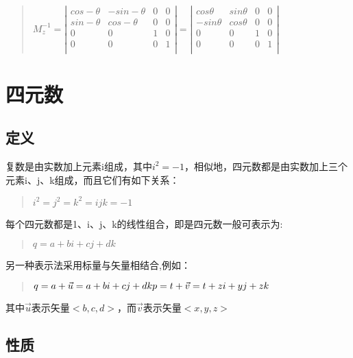 \documentclass[a4paper,10pt]{article}
\begin{document}
\begin{CJK}{UTF8}{song}
\begin{enumerate}
\begin{quote}
\begin{math}
M_{z}^{-1}=\left|
\begin{array}{cccc}
cos-\theta & -sin-\theta & 0 & 0  \\
sin-\theta & cos-\theta & 0 & 0 \\
0 & 0 & 1 & 0 \\
0 & 0 & 0 & 1 \\
\end{array}
\right| 
=
\left| 
\begin{array}{cccc}
cos\theta & sin\theta & 0 & 0 \\
-sin\theta & cos\theta & 0 & 0 \\
0 & 0 & 1 & 0 \\
0 & 0 & 0 & 1 \\
\end{array}
\right|
\end{math}
\end{quote}
\end{enumerate}

\section{四元数}
\subsection{定义}
复数是由实数加上元素i组成，其中$i^{2}=-1$，相似地，四元数都是由实数加上三个元素i、j、k组成，而且它们有如下关系：
\begin{quote}
\begin{math}
i^{2}=j^{2}=k^{2}=ijk=-1 
\end{math}
\end{quote}
每个四元数都是1、i、j、k的线性组合，即是四元数一般可表示为:
\begin{quote}
$q=a+bi+cj+dk$
\end{quote}
另一种表示法采用标量与矢量相结合,例如：
\begin{quote}
\begin{math}
q=a+\vec{u}=a+bi+cj+dk \\
p=t+\vec{v}=t+zi+yj+zk
\end{math}
\end{quote}
其中$\vec{u}$表示矢量$<b,c,d>$，而$\vec{v}$表示矢量$<x,y,z>$

\subsection{性质}

\end{CJK}
\end{document}
